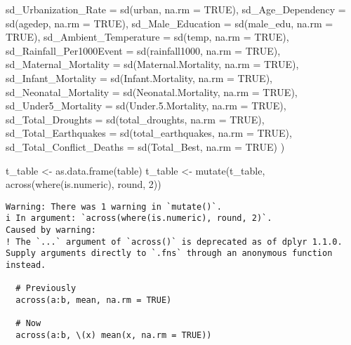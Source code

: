 \documentclass[
  letterpaper,
  DIV=11,
  numbers=noendperiod]{scrartcl}
\newenvironment{Shaded}{\begin{snugshade}}{\end{snugshade}}
\newcommand{\AttributeTok}[1]{\textcolor[rgb]{0.40,0.45,0.13}{#1}}
\newcommand{\ConstantTok}[1]{\textcolor[rgb]{0.56,0.35,0.01}{#1}}
\newcommand{\DecValTok}[1]{\textcolor[rgb]{0.68,0.00,0.00}{#1}}
\newcommand{\FloatTok}[1]{\textcolor[rgb]{0.68,0.00,0.00}{#1}}
\newcommand{\FunctionTok}[1]{\textcolor[rgb]{0.28,0.35,0.67}{#1}}
\newcommand{\NormalTok}[1]{\textcolor[rgb]{0.00,0.23,0.31}{#1}}
\newcommand{\OtherTok}[1]{\textcolor[rgb]{0.00,0.23,0.31}{#1}}
\begin{document}
\begin{Shaded}
\begin{Highlighting}[]
    \AttributeTok{sd\_Urbanization\_Rate =} \FunctionTok{sd}\NormalTok{(urban, }\AttributeTok{na.rm =} \ConstantTok{TRUE}\NormalTok{),}
    \AttributeTok{sd\_Age\_Dependency =} \FunctionTok{sd}\NormalTok{(agedep, }\AttributeTok{na.rm =} \ConstantTok{TRUE}\NormalTok{),}
    \AttributeTok{sd\_Male\_Education =} \FunctionTok{sd}\NormalTok{(male\_edu, }\AttributeTok{na.rm =} \ConstantTok{TRUE}\NormalTok{),}
    \AttributeTok{sd\_Ambient\_Temperature =} \FunctionTok{sd}\NormalTok{(temp, }\AttributeTok{na.rm =} \ConstantTok{TRUE}\NormalTok{),}
    \AttributeTok{sd\_Rainfall\_Per1000Event =} \FunctionTok{sd}\NormalTok{(rainfall1000, }\AttributeTok{na.rm =} \ConstantTok{TRUE}\NormalTok{),}
    \AttributeTok{sd\_Maternal\_Mortality =} \FunctionTok{sd}\NormalTok{(Maternal.Mortality, }\AttributeTok{na.rm =} \ConstantTok{TRUE}\NormalTok{),}
    \AttributeTok{sd\_Infant\_Mortality =} \FunctionTok{sd}\NormalTok{(Infant.Mortality, }\AttributeTok{na.rm =} \ConstantTok{TRUE}\NormalTok{),}
    \AttributeTok{sd\_Neonatal\_Mortality =} \FunctionTok{sd}\NormalTok{(Neonatal.Mortality, }\AttributeTok{na.rm =} \ConstantTok{TRUE}\NormalTok{),}
    \AttributeTok{sd\_Under5\_Mortality =} \FunctionTok{sd}\NormalTok{(Under.}\FloatTok{5.}\NormalTok{Mortality, }\AttributeTok{na.rm =} \ConstantTok{TRUE}\NormalTok{),}
    \AttributeTok{sd\_Total\_Droughts =} \FunctionTok{sd}\NormalTok{(total\_droughts, }\AttributeTok{na.rm =} \ConstantTok{TRUE}\NormalTok{),}
    \AttributeTok{sd\_Total\_Earthquakes =} \FunctionTok{sd}\NormalTok{(total\_earthquakes, }\AttributeTok{na.rm =} \ConstantTok{TRUE}\NormalTok{),}
    \AttributeTok{sd\_Total\_Conflict\_Deaths =} \FunctionTok{sd}\NormalTok{(Total\_Best, }\AttributeTok{na.rm =} \ConstantTok{TRUE}\NormalTok{)}
\NormalTok{  )}

\NormalTok{t\_table }\OtherTok{\textless{}{-}} \FunctionTok{as.data.frame}\NormalTok{(table)}
\NormalTok{t\_table }\OtherTok{\textless{}{-}} \FunctionTok{mutate}\NormalTok{(t\_table, }\FunctionTok{across}\NormalTok{(}\FunctionTok{where}\NormalTok{(is.numeric), round, }\DecValTok{2}\NormalTok{))}
\end{Highlighting}
\end{Shaded}

\begin{verbatim}
Warning: There was 1 warning in `mutate()`.
i In argument: `across(where(is.numeric), round, 2)`.
Caused by warning:
! The `...` argument of `across()` is deprecated as of dplyr 1.1.0.
Supply arguments directly to `.fns` through an anonymous function instead.

  # Previously
  across(a:b, mean, na.rm = TRUE)

  # Now
  across(a:b, \(x) mean(x, na.rm = TRUE))
\end{verbatim}
\end{document}
